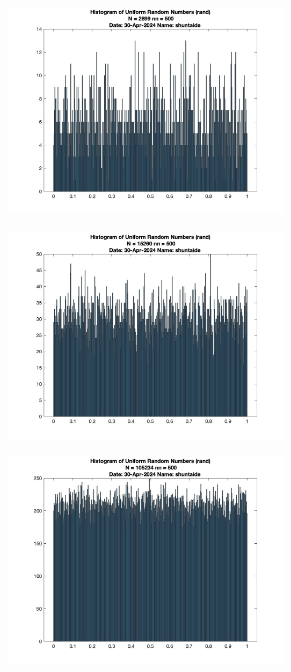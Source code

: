 \begin{figure}
	\centering
	\begin{subfigure}{0.48\linewidth}
		\centering
		\includegraphics[width=0.8\textwidth]{src/figures/uniform/rand_hist_N=2899_nn=500.jpg}
	\end{subfigure}
	\begin{subfigure}{0.48\linewidth}
		\centering
		\includegraphics[width=0.8\textwidth]{src/figures/uniform/rand_hist_N=15260_nn=500.jpg}
	\end{subfigure}
	\begin{subfigure}{0.48\linewidth}
		\centering
		\includegraphics[width=0.8\textwidth]{src/figures/uniform/rand_hist_N=105234_nn=500.jpg}

\end{subfigure}
\end{figure}
